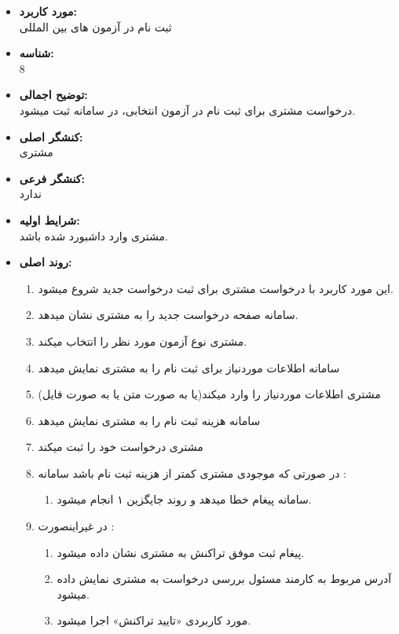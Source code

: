 \documentclass{article}
\begin{document}
\noindent\makebox[\linewidth]{\rule{\paperwidth}{0.4pt}}

\begin{itemize}
\item \textbf{مورد کاربرد:}\\
ثبت نام در آزمون های بین المللی
\item \textbf{شناسه:}\\
8
\item \textbf{توضیح اجمالی:}\\
درخواست مشتری برای ثبت نام در آزمون انتخابی، در سامانه ثبت میشود.
\item \textbf{کنشگر اصلی:}\\
مشتری
\item \textbf{کنشگر فرعی:}\\
ندارد
\item \textbf{شرایط اولیه:}\\
مشتری وارد داشبورد شده باشد.
\item \textbf{روند اصلی:}\\
\begin{enumerate}
\item  این مورد کاربرد با درخواست مشتری برای ثبت درخواست جدید شروع میشود.
\item سامانه صفحه درخواست جدید را به مشتری نشان میدهد.
\item مشتری نوع آزمون مورد نظر را انتخاب میکند.
\item سامانه اطلاعات موردنیاز برای ثبت نام را به مشتری نمایش میدهد
\item مشتری اطلاعات موردنیاز را وارد میکند(یا به صورت متن یا به صورت فایل)
\item سامانه هزینه ثبت نام را به مشتری نمایش میدهد
\item مشتری درخواست خود را ثبت میکند
\item در صورتی که موجودی مشتری کمتر از هزینه ثبت نام باشد سامانه :
\begin{enumerate}
\item سامانه پیغام خطا میدهد و روند جایگزین ۱ انجام میشود. 
\end{enumerate}

\item در غیراینصورت	:
\begin{enumerate}
\item پیغام ثبت موفق تراکنش به مشتری نشان داده میشود.
\item آدرس مربوط به کارمند مسئول بررسی درخواست به مشتری نمایش داده میشود.
\item مورد کاربردی «تایید تراکنش» اجرا میشود.
\end{enumerate}


\end{enumerate}
\end{itemize}
\end{document}
